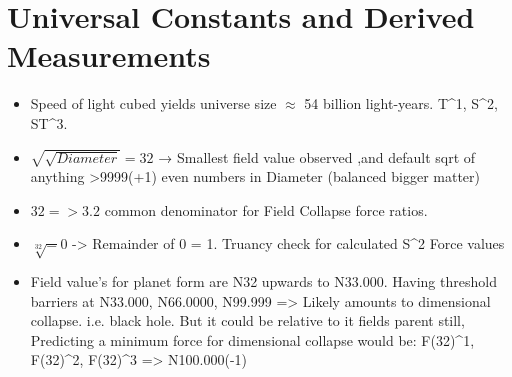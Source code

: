 \documentclass[12pt]{thesis}
\begin{document}
\section{Universal Constants and Derived Measurements}
\begin{itemize}
    \item Speed of light cubed yields universe size $\approx$ 54 billion light-years. T^1, S^2, ST^3.
    \item $\sqrt{\sqrt{Diameter}} = 32$ → Smallest field value observed ,and default sqrt of anything >9999(+1) even numbers in Diameter (balanced bigger matter) 
    \item {$32 => 3.2$} common denominator for Field Collapse force ratios.
    \item $\sqrt[32] = 0$ -> Remainder of 0 = 1. Truancy check for calculated S^2 Force values
    \item Field value's for planet form are N32 upwards to N33.000. Having threshold barriers at N33.000, N66.0000, N99.999 => Likely amounts to dimensional collapse. i.e. black hole. But it could be relative to it fields parent still, Predicting a minimum force for dimensional collapse would be:
    F(32)^1, F(32)^2, F(32)^3 => N100.000(-1) 
\end{itemize}
\end{document}
